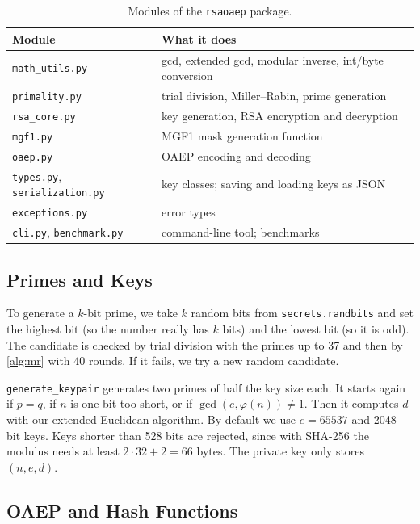 \documentclass[runningheads]{llncs}
\newcommand{\code}[1]{\texttt{#1}}
\begin{document}
\begin{table}[t]
\centering
\caption{Modules of the \code{rsaoaep} package.}\label{tab:modules}
\scriptsize
\begin{tabular}{@{}ll@{}}
\toprule
Module & What it does \\
\midrule
\code{math\_utils.py}   & gcd, extended gcd, modular inverse, int/byte conversion \\
\code{primality.py}     & trial division, Miller--Rabin, prime generation \\
\code{rsa\_core.py}     & key generation, RSA encryption and decryption \\
\code{mgf1.py}          & MGF1 mask generation function \\
\code{oaep.py}          & OAEP encoding and decoding \\
\code{types.py}, \code{serialization.py} & key classes; saving and loading keys as JSON \\
\code{exceptions.py}    & error types \\
\code{cli.py}, \code{benchmark.py} & command-line tool; benchmarks \\
\bottomrule
\end{tabular}
\end{table}

\subsection{Primes and Keys}

To generate a $k$-bit prime, we take $k$ random bits from
\code{secrets.randbits} and set the highest bit (so the number really has $k$
bits) and the lowest bit (so it is odd). The candidate is checked by trial
division with the primes up to 37 and then by \cref{alg:mr} with 40 rounds.
If it fails, we try a new random candidate.

\code{generate\_keypair} generates two primes of half the key size each. It
starts again if $p = q$, if $n$ is one bit too short, or if
$\gcd(e, \varphi(n)) \ne 1$. Then it computes $d$ with our extended Euclidean
algorithm. By default we use $e = 65537$ and 2048-bit keys. Keys shorter than
528 bits are rejected, since with SHA-256 the modulus needs at least
$2 \cdot 32 + 2 = 66$ bytes. The private key only stores $(n, e, d)$.

\subsection{OAEP and Hash Functions}
\end{document}
